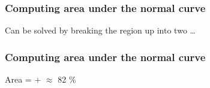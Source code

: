\documentclass[handout]{beamer}
\begin{document}
   \begin{frame}
   \frametitle{Computing area under the normal curve}
   \begin{center}
   \end{center}
   Can be solved by breaking the region up into two \dots
   \end{frame}



   \begin{frame}
   \frametitle{Computing area under the normal curve}
   \begin{center}
   \end{center}
   Area = {\color{green}{95.45 \% / 2} }+ {\color{blue}{68.27 \% / 2}} $\approx$ 82 \%
   \end{frame}

\end{document}

